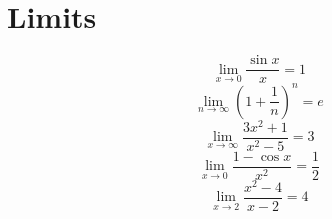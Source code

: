\documentclass[11pt,a4paper]{article}
\theoremstyle{plain}
\theoremstyle{definition}
\theoremstyle{remark}
\begin{document}
\section*{Limits}

\begin{equation*}
  \lim_{x \to 0} \frac{\sin x}{x} = 1
\end{equation*}
\begin{equation*}
  \lim_{n \to \infty} \left(1 + \frac{1}{n}\right)^n = e
\end{equation*}
\begin{equation*}
  \lim_{x \to \infty} \frac{3 x^2 + 1}{x^2 - 5} = 3
\end{equation*}
\begin{equation*}
  \lim_{x \to 0} \frac{1 - \cos x}{x^2} = \frac{1}{2}
\end{equation*}
\begin{equation*}
  \lim_{x \to 2} \frac{x^2 - 4}{x - 2} = 4
\end{equation*}
\end{document}

